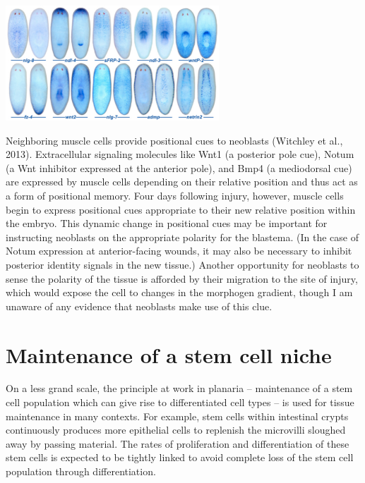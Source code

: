 \documentclass{article}
\begin{document}
\begin{center}
\includegraphics[width=0.6\textwidth]{pcg.pdf}
\end{center}

Neighboring muscle cells provide positional cues to neoblasts (Witchley et al., 2013). Extracellular signaling molecules like Wnt1 (a posterior pole cue), Notum (a Wnt inhibitor expressed at the anterior pole), and Bmp4 (a mediodorsal cue) are expressed by muscle cells depending on their relative position and thus act as a form of positional memory. Four days following injury, however, muscle cells begin to express positional cues appropriate to their new relative position within the embryo. This dynamic change in positional cues may be important for instructing neoblasts on the appropriate polarity for the blastema. (In the case of Notum expression at anterior-facing wounds, it may also be necessary to inhibit posterior identity signals in the new tissue.) Another opportunity for neoblasts to sense the polarity of the tissue is afforded by their migration to the site of injury, which would expose the cell to changes in the morphogen gradient, though I am unaware of any evidence that neoblasts make use of this clue.

\section*{Maintenance of a stem cell niche}

On a less grand scale, the principle at work in planaria -- maintenance of a stem cell population which can give rise to differentiated cell types -- is used for tissue maintenance in many contexts. For example, stem cells within intestinal crypts continuously produces more epithelial cells to replenish the microvilli sloughed away by passing material. The rates of proliferation and differentiation of these stem cells is expected to be tightly linked to avoid complete loss of the stem cell population through differentiation.\\
\end{document}
